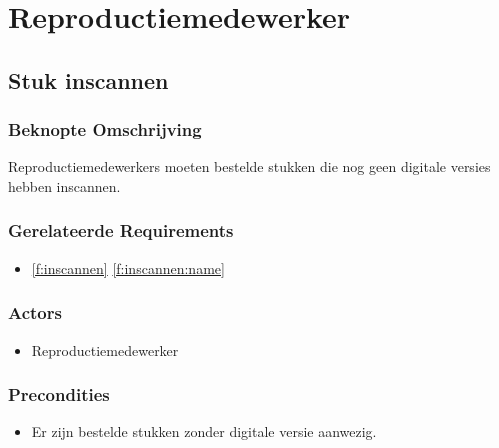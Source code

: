 \documentclass[a4paper,titlepage]{report}
\makeatletter
\def\namedlabel#1#2{
  \label{#1}
  \begingroup
   \def\@currentlabel{#2}%
   \label{#1:name}\endgroup
}
\def\namedref#1{\ref{#1} \ref{#1:name}}
\makeatother
\begin{document}
  \pagebreak
  \section{Reproductiemedewerker}
    \subsection{Stuk inscannen}
    \namedlabel{u:inscannen}{Stuk inscannen}
      \subsubsection{Beknopte Omschrijving}
        Reproductiemedewerkers moeten bestelde stukken die nog geen digitale
        versies hebben inscannen.
      \subsubsection{Gerelateerde Requirements}
        \begin{itemize}
          \item \namedref{f:inscannen}
        \end{itemize}
      \subsubsection{Actors}
        \begin{itemize}
          \item Reproductiemedewerker
        \end{itemize}
      \subsubsection{Precondities}
        \begin{itemize}
          \item Er zijn bestelde stukken zonder digitale versie aanwezig.
        \end{itemize}
\end{document}
